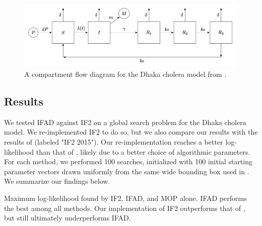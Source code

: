 \documentclass[9pt,twocolumn,pnasresearcharticle]{pnas-new}
\newcommand\arxiv[2]{#2} %
\begin{document}
\begin{figure}
    \centering
    \includegraphics[width=\arxiv{14cm}{\textwidth/2}]{imgs/095/tikzcholera.png}
    \vspace*{-7mm}
    \caption{A compartment flow diagram for the Dhaka cholera model from \cite{king08}.}
    \label{fig:tikz-cholera}
    \arxiv{}{\vspace*{-3mm}}
\end{figure}

\arxiv{}{\vspace*{-2mm}}
\subsection{Results}

We tested IFAD against IF2 on a global search problem for the Dhaka cholera model.
We re-implemented IF2 to do so, but we also compare our results with the results of \cite{ionides15} (labeled "IF2 2015").
Our re-implementation reaches a better log-likelihood than that of \cite{ionides15}, likely due to a better choice of algorithmic parameters.
For each method, we performed 100 searches, initialized with 100 initial starting parameter vectors drawn uniformly from the same wide bounding box used in \cite{ionides15}. We summarize our findings below. 

  
\arxiv{}{\vspace*{-1mm}}
\begin{table}[h!]
\centering

\caption{Maximum log-likelihood found by IF2, IFAD, and MOP alone. IFAD performs the best among all methods. Our implementation of IF2 outperforms that of \cite{ionides15}, but still ultimately underperforms IFAD. }
\arxiv{}{\vspace*{-7mm}}
\label{table:mle}
\end{table}
\end{document}
